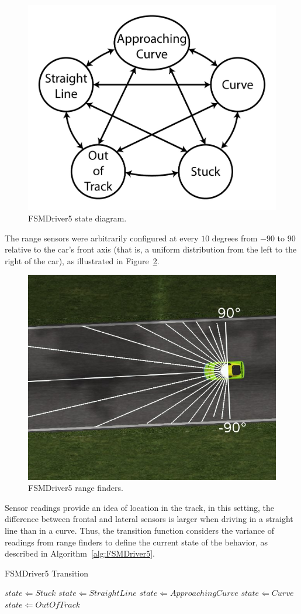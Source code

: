 \begin{figure}[h]
	\centering
	\includegraphics[width=.45\textwidth]{img/FiveStateFSM}
	\caption{FSMDriver5 state diagram.}
	\label{Fig:FSM5Diagram}
\end{figure}

The range sensors were arbitrarily configured at every $10$ degrees from $-90$ to $90$ relative to the car's front axis (that is, a uniform distribution from the left to the right of the car), as illustrated in Figure~\ref{Fig:FSM5Sensors}.

\begin{figure}[h]
	\centering
	\includegraphics[width=.45\textwidth]{img/FSM5Sensors}
	\caption{FSMDriver5 range finders.}
	\label{Fig:FSM5Sensors}
\end{figure}

Sensor readings provide an idea of location in the track, in this setting, the difference between frontal and lateral sensors is larger when driving in a straight line than in a curve. Thus, the transition function considers the variance of readings from range finders to define the current state of the  behavior, as described in Algorithm~\ref{alg:FSMDriver5}.

\begin{algorithm}[h]%
\caption{FSMDriver5 Transition}%
\label{alg:FSMDriver5}%
\begin{algorithmic}
        \STATE $state \Leftarrow Stuck$
    \ELSE
   		\STATE $state \Leftarrow StraightLine$
	\ENDIF
		\STATE $state \Leftarrow Approaching Curve$
		\STATE $state \Leftarrow Curve$
	\ELSE
		\STATE $state \Leftarrow Out Of Track$
	\ENDIF
\end{algorithmic}
\end{algorithm}

